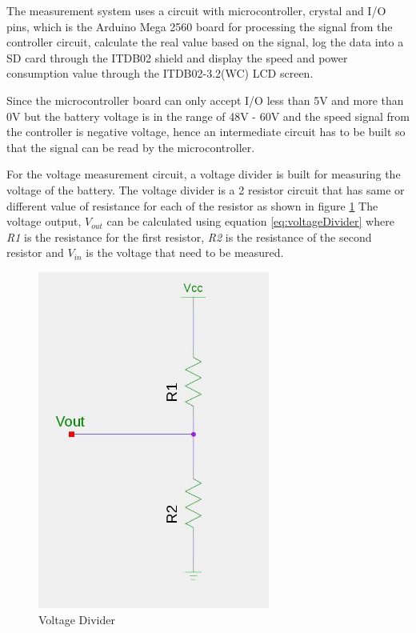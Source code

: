 The measurement system uses a circuit with microcontroller, crystal and I/O pins, which is the Arduino Mega 2560 board for processing the signal from the controller circuit, calculate the real value based on the signal, log the data into a SD card through the ITDB02 shield and display the speed and power consumption value through the ITDB02-3.2(WC) LCD screen.

Since the microcontroller board can only accept I/O less than 5V and more than 0V but the battery voltage is in the range of 48V - 60V and the speed signal from the controller is negative voltage, hence an intermediate circuit has to be built so that the signal can be read by the microcontroller.

For the voltage measurement circuit, a voltage divider is built for measuring the voltage of the battery. The voltage divider is a 2 resistor circuit that has same or different value of resistance for each of the resistor as shown in figure \ref{im:voltageDivider} The voltage output, \textit{$V_{out}$} can be calculated using equation \ref{eq:voltageDivider} where \textit{R1} is the resistance for the first resistor, \textit{R2} is the resistance of the second resistor and \textit{$V_{in}$} is the voltage that need to be measured.

\begin{figure}[htb]
	\centering
	\includegraphics[width=3in]{images/voltage_divider.jpg}
	\caption{Voltage Divider}
	\label{im:voltageDivider}
\end{figure}

